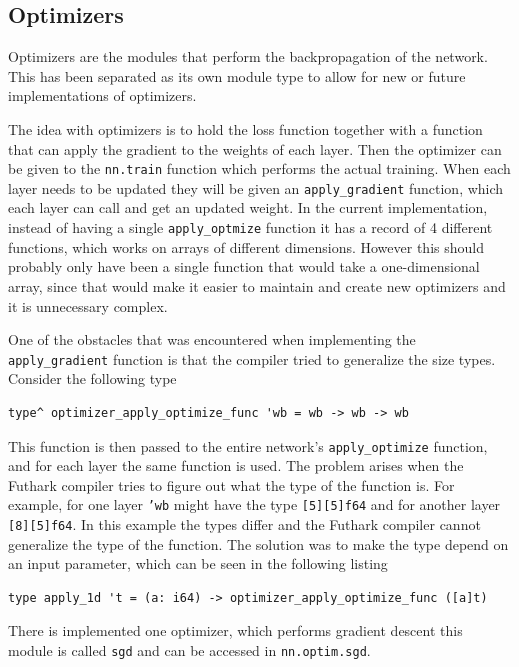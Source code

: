 \subsection{Optimizers}

Optimizers are the modules that perform the backpropagation of the network.
This has been separated as its own module type to allow for new or future implementations of optimizers.

The idea with optimizers is to hold the loss function together with a function that can apply the gradient to the weights of each layer.
Then the optimizer can be given to the \texttt{nn.train} function which performs the actual training. When each layer needs to be updated they will be given an \texttt{apply\_gradient} function, which each layer can call and get an updated weight.
In the current implementation, instead of having a single \texttt{apply\_optmize} function it has a record of 4 different functions, which works on arrays of different dimensions. However this should probably only have been a single function that would take a one-dimensional array, since that would make it easier to maintain and create new optimizers and it is unnecessary complex.

One of the obstacles that was encountered when implementing the \\%
\texttt{apply\_gradient} function is that the compiler tried to generalize the size types. Consider the following type
\begin{lstlisting}
type^ optimizer_apply_optimize_func 'wb = wb -> wb -> wb
\end{lstlisting}
This function is then passed to the entire network's \texttt{apply\_optimize} function, and for each layer the same function is used.
The problem arises when the Futhark compiler tries to figure out what the type of the function is.
For example, for one layer \texttt{'wb} might have the type \texttt{[5][5]f64} and for another layer \texttt{[8][5]f64}.
In this example the types differ and the Futhark compiler cannot generalize the type of the function.
The solution was to make the type depend on an input parameter, which can be seen in the following listing
\begin{lstlisting}
type apply_1d 't = (a: i64) -> optimizer_apply_optimize_func ([a]t)
\end{lstlisting}

There is implemented one optimizer, which performs gradient descent this module is called \texttt{sgd} and can be accessed in \texttt{nn.optim.sgd}.

